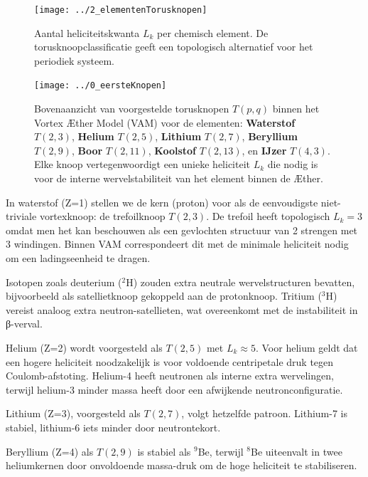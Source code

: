 \begin{figure}[H]
    \centering
    \texttt{[image: ../2\_elementenTorusknopen]}
    \caption{Aantal heliciteitskwanta $L_k$ per chemisch element. De torusknoopclassificatie geeft een topologisch alternatief voor het periodiek systeem.}
    \label{fig:elementen_torusknoop}
\end{figure}

\begin{figure}[H]
    \centering
    \texttt{[image: ../0\_eersteKnopen]}
    \caption[Torusknopen voor lichte elementen (bovenaanzicht)]{
        Bovenaanzicht van voorgestelde torusknopen \( T(p, q) \) binnen het Vortex Æther Model (VAM) voor de elementen:
        \textbf{Waterstof} \(T(2,3)\),
        \textbf{Helium} \(T(2,5)\),
        \textbf{Lithium} \(T(2,7)\),
        \textbf{Beryllium} \(T(2,9)\),
        \textbf{Boor} \(T(2,11)\),
        \textbf{Koolstof} \(T(2,13)\), en
        \textbf{IJzer} \(T(4,3)\).
        Elke knoop vertegenwoordigt een unieke heliciteit \( L_k \) die nodig is voor de interne wervelstabiliteit van het element binnen de Æther.
    }
    \label{fig:torusknopen_top}
\end{figure}


In waterstof (Z=1) stellen we de kern (proton) voor als de eenvoudigste niet-triviale vortexknoop: de trefoilknoop $T(2,3)$. De trefoil heeft topologisch $L_k=3$ omdat men het kan beschouwen als een gevlochten structuur van 2 strengen met 3 windingen. Binnen VAM correspondeert dit met de minimale heliciteit nodig om een ladingseenheid te dragen.

Isotopen zoals deuterium ($^2$H) zouden extra neutrale wervelstructuren bevatten, bijvoorbeeld als satellietknoop gekoppeld aan de protonknoop. Tritium ($^3$H) vereist analoog extra neutron-satellieten, wat overeenkomt met de instabiliteit in β-verval.

Helium (Z=2) wordt voorgesteld als $T(2,5)$ met $L_k \approx 5$. Voor helium geldt dat een hogere heliciteit noodzakelijk is voor voldoende centripetale druk tegen Coulomb-afstoting. Helium-4 heeft neutronen als interne extra wervelingen, terwijl helium-3 minder massa heeft door een afwijkende neutronconfiguratie.

Lithium (Z=3), voorgesteld als $T(2,7)$, volgt hetzelfde patroon. Lithium-7 is stabiel, lithium-6 iets minder door neutrontekort.

Beryllium (Z=4) als $T(2,9)$ is stabiel als $^9$Be, terwijl $^8$Be uiteenvalt in twee heliumkernen door onvoldoende massa-druk om de hoge heliciteit te stabiliseren.

